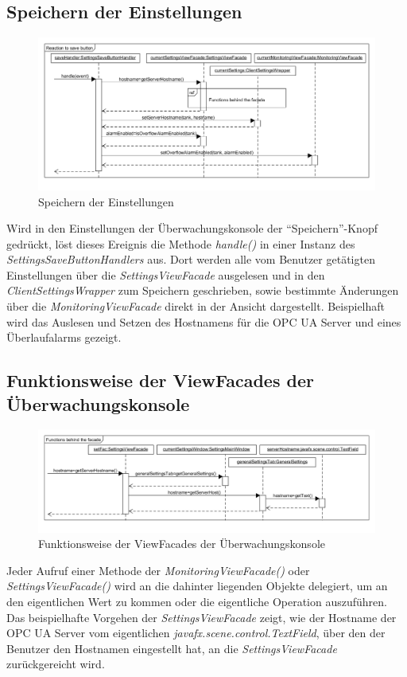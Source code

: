 \documentclass[parskip=full]{scrartcl}
\begin{document}
\subsection{Speichern der Einstellungen}
\begin{figure}[H]
	\centering
	\includegraphics[scale=0.4]{design/sequence-diagrams/save-settings.png}
	\caption{Speichern der Einstellungen}
\end{figure}
Wird in den Einstellungen der Überwachungskonsole der "`Speichern"'-Knopf gedrückt, löst dieses Ereignis die Methode \emph{handle()} in einer Instanz des \emph{SettingsSaveButtonHandlers} aus.
Dort werden alle vom Benutzer getätigten Einstellungen über die \emph{SettingsViewFacade} ausgelesen und in den \emph{ClientSettingsWrapper} zum Speichern geschrieben, sowie bestimmte Änderungen über die \emph{MonitoringViewFacade} direkt in der Ansicht dargestellt.
Beispielhaft wird das Auslesen und Setzen des Hostnamens für die OPC UA Server und eines Überlaufalarms gezeigt.

\subsection{Funktionsweise der ViewFacades der Überwachungskonsole}
\begin{figure}[H]
	\centering
	\includegraphics[scale=0.4]{design/sequence-diagrams/functions-behind-the-facade.png}
	\caption{Funktionsweise der ViewFacades der Überwachungskonsole}
\end{figure}
Jeder Aufruf einer Methode der \emph{MonitoringViewFacade()} oder \emph{SettingsViewFacade()} wird an die dahinter liegenden Objekte delegiert, um an den eigentlichen Wert zu kommen oder die eigentliche Operation auszuführen. Das beispielhafte Vorgehen der \emph{SettingsViewFacade} zeigt, wie der Hostname der OPC UA Server vom eigentlichen \emph{javafx.scene.control.TextField}, über den der Benutzer den Hostnamen eingestellt hat, an die \emph{SettingsViewFacade} zurückgereicht wird.
\end{document}
